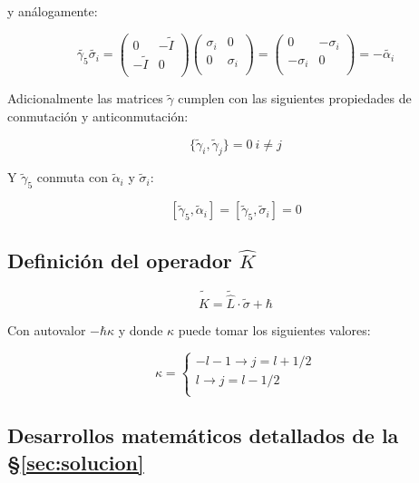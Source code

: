 \documentclass[a4paper, 12pt]{article} %
\begin{document}
y an\'alogamente:

\[
\widetilde{\gamma_5}\widetilde{\sigma_i} = 
\begin{pmatrix} 
0 & - \widetilde{I} \\
-\widetilde{I} & 0 \\
\end{pmatrix} 
\begin{pmatrix} 
\sigma_i & 0 \\
0 & \sigma_i  \\
\end{pmatrix} 
= 
\begin{pmatrix}
0 & -\sigma_i \\
-\sigma_i & 0 \\
\end{pmatrix}
= -\widetilde{\alpha_i}
\]

Adicionalmente las matrices $\widetilde{\gamma}$ cumplen con las siguientes
propiedades de conmutaci\'on y anticonmutaci\'on:

\[
\{ \widetilde{\gamma}_i, \widetilde{\gamma}_j \} = 0 \ i \neq j
\]

Y $\widetilde{\gamma}_5$ conmuta con $\widetilde{\alpha}_i$ y $\widetilde{\sigma}_i$: 

\[
[\widetilde{\gamma}_5, \widetilde{\alpha}_i] = [\widetilde{\gamma}_5,\widetilde{\sigma}_i] = 0
\]

\subsection{Definici\'on del operador $\hat{K}$}\label{sec:k}

\begin{equation}
\widetilde{\hat{K}} = \widetilde{\hat{L}}\cdot \widetilde{\sigma} + \hbar
\end{equation}

Con autovalor $-\hbar \kappa$ y donde $\kappa$ puede tomar los siguientes
valores:

\[ \kappa = 
\begin{cases}
-l - 1 \rightarrow j = l + 1/2  \\
l \rightarrow j = l - 1/2 \\ 
\end{cases}
\]  


\subsection{Desarrollos matem\'aticos detallados de la \S \ref{sec:solucion}}\label{sec:pasoapaso}
\end{document}

